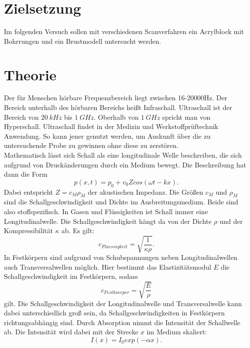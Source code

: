 \section{Zielsetzung}
\label{sec:Zielsetzung}
Im folgenden Versuch sollen mit verschiedenen Scanverfahren ein Acrylblock mit Bohrrungen und ein Brustmodell untersucht werden.
\section{Theorie}
\label{sec:Theorie}
Der für Menschen hörbare Frequenzbereich liegt zwischen 16-20000Hz. Der Bereich unterhalb des hörbaren Bereichs heißt Infraschall. Ultraschall ist der Bereich von 
$\SI{20}{kHz}$ bis $\SI{1}{GHz}$. Oberhalb von $\SI{1}{GHz}$ spricht man von Hyperschall. Ultraschall findet in der Medizin und Werkstoffprüftechnik Anwendung. So kann jener
genutzt werden, um Auskunft über die zu untersuchende Probe zu gewinnen ohne diese zu zerstören.\\
Mathematisch lässt sich Schall als eine longitudinale Welle beschreiben, die sich aufgrund von Druckänderungen durch ein Medium bewegt. Die Beschreibung hat dann die Form
\begin{equation*}
    p(x, t) = p_0 + v_0 Z cos(\omega t - kx).
\end{equation*}
Dabei entspricht $Z = c_M \rho_M$ der akustischen Impedanz. Die Größen $c_M$ und $\rho_M$ sind die Schallgeschwindigkeit und Dichte im Ausbreitungsmedium. Beide sind also
stoffspezifisch.
In Gasen und Flüssigkeiten ist Schall immer eine Longitudinalwelle. Die Schallgeschwindigkeit hängt da von der Dichte $\rho$ und der Kompressibilität $\kappa$ ab. Es gilt:
\begin{equation*}
    c_{Fluessigkeit} = \sqrt{\frac{1}{\kappa \rho}}.
\end{equation*}
In Festkörpern sind aufgrund von Schubspannungen neben Longitudinalwellen auch Transversalwellen möglich. Hier bestimmt das Elastizitätsmodul $E$ die Schallgeschwindigkeit
im Festkörpern, sodass
\begin{equation*}
    c_{Festkoerper} = \sqrt{\frac{E}{\rho}}
\end{equation*}
gilt.
Die Schallgeschwindigkeit der Longitudinalwelle und Transversalwelle kann dabei unterschiedlich groß sein, da Schallgeschwindigkeiten in Festkörpern richtungsabhängig sind.
Durch Absorption nimmt die Intensität der Schallwelle ab. Die Intensität wird dabei mit der Strecke $x$ im Medium skaliert:
\begin{equation*}
    I(x) = I_0 exp(-\alpha x).
\end{equation*}
